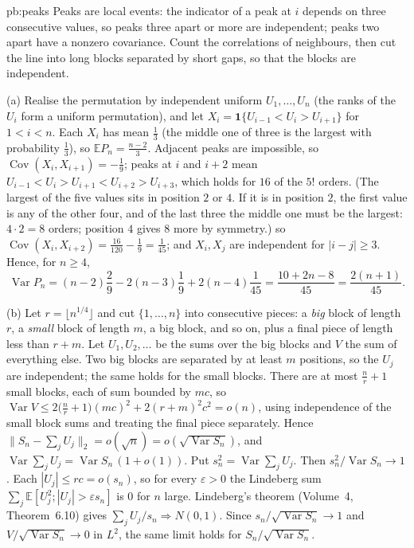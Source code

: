 \begin{solution}{pb:peaks}
\idea Peaks are local events: the indicator of a peak at $i$ depends on three consecutive values, so peaks three apart or more are independent; peaks two apart have a nonzero covariance. Count the
correlations of neighbours, then cut the line into long blocks separated by short gaps, so that the blocks are independent.

\writeup (a) Realise the permutation by independent uniform $U_1,\dots,U_n$ (the ranks of the $U_i$ form a uniform permutation), and let $X_i=\mathbf 1\{U_{i-1}<U_i>U_{i+1}\}$
for $1<i<n$. Each $X_i$ has mean $\frac13$ (the middle one of three is the largest with probability $\frac13$), so $\mathbb EP_n=\frac{n-2}3$. Adjacent peaks are
impossible, so $\operatorname{Cov}(X_i,X_{i+1})=-\frac19$; peaks at $i$ and $i+2$ mean $U_{i-1}<U_i>U_{i+1}<U_{i+2}>U_{i+3}$, which holds for $16$ of the $5!$ orders. (The largest of the five values sits in position $2$ or $4$. If it is in position $2$, the first value is any of
the other four, and of the last three the middle one must be the largest: $4\cdot2=8$ orders; position $4$ gives $8$ more by symmetry.) so $\operatorname{Cov}(X_i,X_{i+2})=\frac{16}{120}-\frac19=\frac1{45}$; and $X_i,X_j$ are independent for $|i-j|\ge3$. Hence, for $n\ge4$,
\[
\operatorname{Var}P_n=(n-2)\frac29-2(n-3)\frac19+2(n-4)\frac1{45}=\frac{10+2n-8}{45}=\frac{2(n+1)}{45}.
\]

(b) Let $r=\lfloor n^{1/4}\rfloor$ and cut $\{1,\dots,n\}$ into consecutive pieces: a \emph{big} block of length $r$, a \emph{small} block of length $m$, a big block, and so
on, plus a final piece of length less than $r+m$. Let $U_1,U_2,\dots$ be the sums over the big blocks and $V$ the sum of everything else. Two big blocks are separated by
at least $m$ positions, so the $U_j$ are independent; the same holds for the small blocks. There are at most $\frac n r+1$ small blocks, each of sum bounded by $mc$,
so $\operatorname{Var}V\le2\bigl(\frac nr+1\bigr)(mc)^2+2(r+m)^2c^2=o(n)$, using independence of the small block sums and treating the final piece separately. Hence
$\|S_n-\sum_jU_j\|_2=o(\sqrt n)=o(\sqrt{\operatorname{Var}S_n})$, and $\operatorname{Var}\sum_jU_j=\operatorname{Var}S_n\,(1+o(1))$. Put $s_n^2=\operatorname{Var}\sum_jU_j$. Then $s_n^2/\operatorname{Var}S_n\to1$. Each $|U_j|\le rc=o(s_n)$,
so for every $\varepsilon>0$ the Lindeberg sum $\sum_j\mathbb E[U_j^2;|U_j|>\varepsilon s_n]$ is $0$ for $n$ large. Lindeberg's theorem (Volume~4,
Theorem~6.10) gives $\sum_jU_j/s_n\Rightarrow N(0,1)$. Since $s_n/\sqrt{\operatorname{Var}S_n}\to1$ and $V/\sqrt{\operatorname{Var}S_n}\to0$ in $L^2$, the same limit holds for $S_n/\sqrt{\operatorname{Var}S_n}$.


\end{solution}
